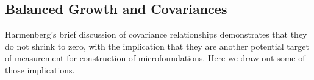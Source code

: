 \documentclass[ProjectDLO]{subfiles}
\begin{document}
\hypertarget{Balanced-Growth-Of-Covariances}{}
\subsection{Balanced Growth and Covariances}\label{subsec:Covariances}

\begin{comment}
From the perspective of period $t$, %
\begin{align*}
\BLevBF_{t+1} & = \Mean[b_{t+1} \pLevBF_{t+1}]
\\              & = \PGro \Mean[\cRat_{t}(\Rfree/(\PGro\pShk_{t+1}))\pShk_{t+1}\pLevBF_{t}]
\\              & = \PGro \Mean[\cRat_{t}\Rnorm\pLevBF_{t}]
\\              & = \PGro \Mean[(\mRat_{t}-\cFunc(\mRat_{t}))\Rnorm\pLevBF_{t}]
\\              & = \PGro \Mean[(\bRat_{t}+\tShk_{t}-\cFunc(\bRat_{t}+\tShk_{t}))\Rnorm\pLevBF_{t}]
\end{align*}
\end{comment}

Harmenberg's brief discussion of covariance relationships demonstrates that they do not shrink to zero, with the implication
that they are another potential target of measurement for construction of microfoundations.  Here we draw out some of those
implications.
\end{document}
